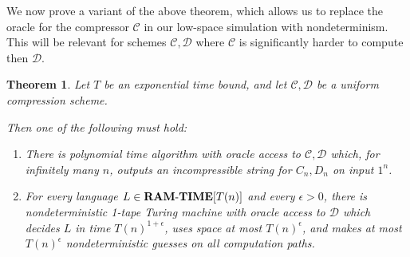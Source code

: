 \documentclass[11pt]{article}
\newtheorem{theorem}{Theorem}
\newcommand{\dash}{\text{-}}
\def\cl{\bf}
\begin{document}
We now prove a variant of the above theorem, which allows us to replace the oracle for the compressor $\mathcal{C}$ in our low-space simulation with nondeterminism. This will be relevant for schemes $\mathcal{C},\mathcal{D}$ where $\mathcal{C}$ is significantly harder to compute then $\mathcal{D}$.
\begin{theorem}\label{thm:swap-d-for-np}
Let $T$ be an exponential time bound, and let $\mathcal{C},\mathcal{D}$ be a uniform compression scheme.

Then one of the following must hold:
\begin{enumerate}
    \item There is polynomial time algorithm with oracle access to $\mathcal{C},\mathcal{D}$ which, for infinitely many $n$, outputs an incompressible string for $C_n,D_n$ on input $1^n$.
    \item For every language $L \in {\cl RAM\dash TIME}[T(n)]$ and every $\epsilon > 0$, there is nondeterministic 1-tape Turing machine with oracle access to $\mathcal{D}$ which decides $L$ in time $T(n)^{1+\epsilon}$, uses space at most $T(n)^{\epsilon}$, and makes at most $T(n)^{\epsilon}$ nondeterministic guesses on all computation paths.
\end{enumerate}
\end{theorem}
\end{document}
